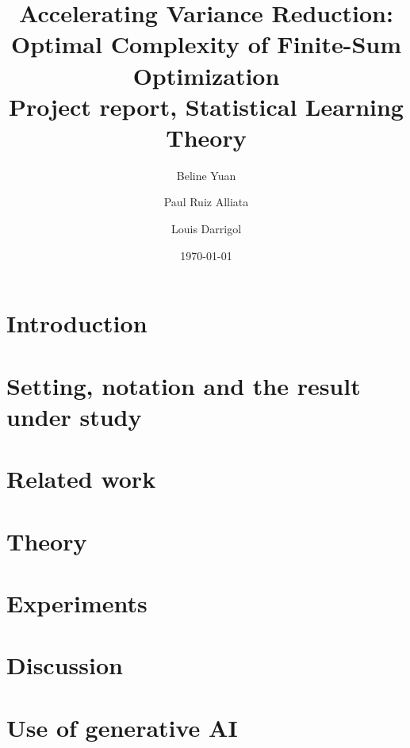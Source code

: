\documentclass[11pt]{article}
\title{Accelerating Variance Reduction:\\ Optimal Complexity of Finite-Sum Optimization\\[4pt]
\large Project report, Statistical Learning Theory}
\author{Beline Yuan \and Paul Ruiz Alliata \and Louis Darrigol}
\date{\today}
\begin{document}
\maketitle

\begin{abstract}

\end{abstract}

\tableofcontents

\section{Introduction}\label{sec:intro}


\section{Setting, notation and the result under study}\label{sec:setting}


\section{Related work}\label{sec:related}


\section{Theory}\label{sec:theory}


\section{Experiments}\label{sec:experiments}


\section{Discussion}\label{sec:discussion}


\section*{Use of generative AI}

\end{document}
